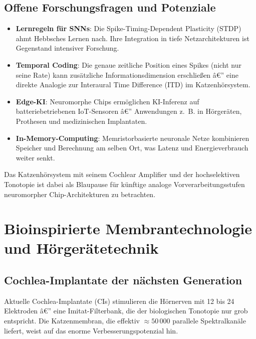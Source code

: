 ﻿\documentclass[12pt,a4paper,titlepage]{report}
\begin{document}
\subsection{Offene Forschungsfragen und Potenziale}

\begin{itemize}[leftmargin=2em]
    \item \textbf{Lernregeln für SNNs}: Die Spike-Timing-Dependent Plasticity (STDP)
        ahmt Hebbsches Lernen nach. Ihre Integration in tiefe Netzarchitekturen
        ist Gegenstand intensiver Forschung.
    \item \textbf{Temporal Coding}: Die genaue zeitliche Position eines Spikes
        (nicht nur seine Rate) kann zusätzliche Informationsdimension erschließen â€”
        eine direkte Analogie zur Interaural Time Difference (ITD) im Katzenhörsystem.
    \item \textbf{Edge-KI}: Neuromorphe Chips ermöglichen KI-Inferenz auf
        batteriebetriebenen IoT-Sensoren â€” Anwendungen z.~B. in Hörgeräten, Prothesen
        und medizinischen Implantaten.
    \item \textbf{In-Memory-Computing}: Memristorbasierte neuronale Netze kombinieren
        Speicher und Berechnung am selben Ort, was Latenz und Energieverbrauch
        weiter senkt.
\end{itemize}

Das Katzenhörsystem mit seinem Cochlear Amplifier und der hochselektiven
Tonotopie ist dabei als Blaupause für künftige analoge Vorverarbeitungsstufen
neuromorpher Chip-Architekturen zu betrachten.

\section{Bioinspirierte Membrantechnologie und Hörgerätetechnik}

\subsection{Cochlea-Implantate der nächsten Generation}

Aktuelle Cochlea-Implantate (CIs) stimulieren die Hörnerven mit 12 bis 24
Elektroden â€” eine Imitat-Filterbank, die der biologischen Tonotopie nur grob entspricht.
Die Katzenmembran, die effektiv $\approx 50\,000$ parallele Spektralkanäle liefert,
weist auf das enorme Verbesserungspotenzial hin.
\end{document}
